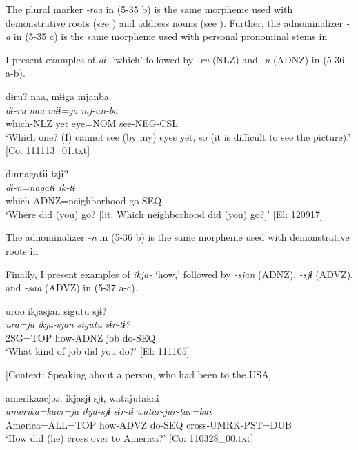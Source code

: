 The plural marker \textit{-taa} in (5-35 b) is the same morpheme used with demonstrative roots (see ) and address nouns (see ). Further, the adnominalizer \textit{{}-a} in (5-35 c) is the same morpheme used with personal pronominal stems in 

  I present examples of \textit{dɨ-} ‘which’ followed by \textit{{}-ru} (NLZ) and \textit{{}-n} (ADNZ) in (5-36 a-b).

\ea \label{ex:5:36}  \ea \label{ex:5:a} %
\glll  dɨru?  naa,  mɨɨga  mjanba.\\
\textit{dɨ-ru}  \textit{naa}  \textit{mɨɨ=ga}  \textit{mj-an-ba}\\
which-NLZ  yet  eye=NOM  see-NEG-CSL\\
\glt ‘Which one? (I) cannot see (by my) eyes yet, so (it is difficult to see the picture).’ [Co: 111113\_01.txt]

 \ex \label{ex:5:b} %
\glll  dɨnnagatɨɨ  izjɨ?\\
\textit{dɨ-n=nagatɨ}  \textit{ik-tɨ}\\
which-ADNZ=neighborhood  go-SEQ\\
\glt ‘Where did (you) go? [lit. Which neighborhood did (you) go?]’ [El: 120917]
\z
\z

The adnominalizer \textit{{}-n} in (5-36 b) is the same morpheme used with demonstrative roots in 

  Finally, I present examples of \textit{ikja-} ‘how,’ followed by \textit{{}-sjan} (ADNZ), \textit{{}-sjɨ} (ADVZ), and \textit{{}-saa} (ADVZ) in (5-37 a-c).

\ea \label{ex:5:37}  \ea \label{ex:5:a} %
\glll  uroo  ikjasjan  sigutu  sjɨ?\\
\textit{ura=ja}  \textit{ikja-sjan}  \textit{sigutu}  \textit{sɨr-tɨ?}\\
2SG=TOP  how-ADNZ  job  do-SEQ\\
\glt ‘What kind of job did you do?’ [El: 111105]

 \ex \label{ex:5:b} [Context: Speaking about a person, who had been to the USA]

\glll  {\textbar}amerika{\textbar}acjəə,  ikjasjɨ  sjɨ,  watajutakai\\
\textit{amerika=kaci=ja}  \textit{ikja-sjɨ}  \textit{sɨr-tɨ}  \textit{watar-jur-tar=kai}\\
America=ALL=TOP  how-ADVZ  do-SEQ  cross-UMRK-PST=DUB\\
\glt ‘How did (he) cross over to America?’ [Co: 110328\_00.txt]

